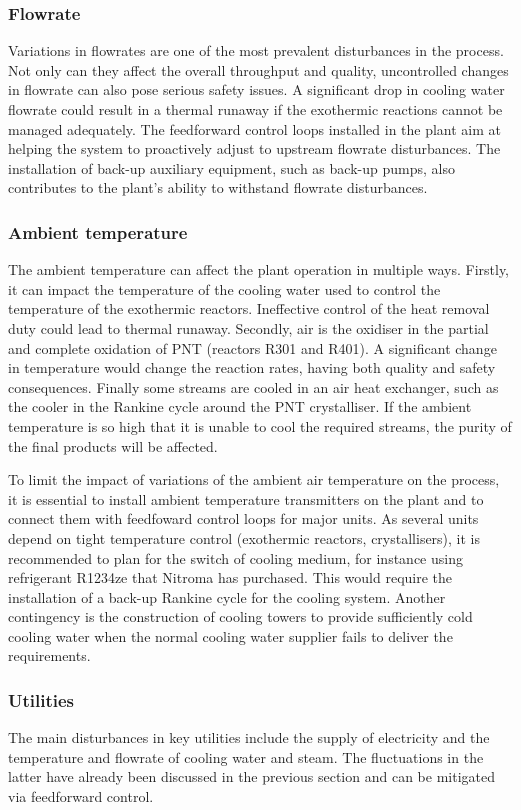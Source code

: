 \subsubsection{Flowrate}
Variations in flowrates are one of the most prevalent disturbances in the process. Not only can they affect the overall throughput and quality, uncontrolled changes in flowrate can also pose serious safety issues. A significant drop in cooling water flowrate could result in a thermal runaway if the exothermic reactions cannot be managed adequately. The feedforward control loops installed in the plant aim at helping the system to proactively adjust to upstream flowrate disturbances. The installation of back-up auxiliary equipment, such as back-up pumps, also contributes to the plant's ability to withstand flowrate disturbances.

\subsubsection{Ambient temperature}
The ambient temperature can affect the plant operation in multiple ways. Firstly, it can impact the temperature of the cooling water used to control the temperature of the exothermic reactors. Ineffective control of the heat removal duty could lead to thermal runaway. Secondly, air is the oxidiser in the partial and complete oxidation of PNT (reactors R301 and R401). A significant change in temperature would change the reaction rates, having both quality and safety consequences. Finally some streams are cooled in an air heat exchanger, such as the cooler in the Rankine cycle around the PNT crystalliser. If the ambient temperature is so high that it is unable to cool the required streams, the purity of the final products will be affected. 

To limit the impact of variations of the ambient air temperature on the process, it is essential to install ambient temperature transmitters on the plant and to connect them with feedfoward control loops for major units. As several units depend on tight temperature control (exothermic reactors, crystallisers), it is recommended to plan for the switch of cooling medium, for instance using refrigerant R1234ze that Nitroma has purchased. This would require the installation of a back-up Rankine cycle for the cooling system. Another contingency is the construction of cooling towers to provide sufficiently cold cooling water when the normal cooling water supplier fails to deliver the requirements.

\subsubsection{Utilities}
The main disturbances in key utilities include the supply of electricity and the temperature and flowrate of cooling water and steam. The fluctuations in the latter have already been discussed in the previous section and can be mitigated via feedforward control.

